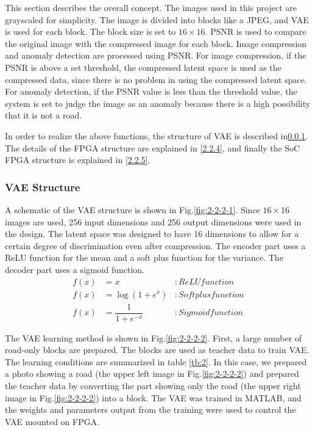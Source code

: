 \documentclass[conference]{IEEEtran}
\begin{document}
This section describes the overall concept.
The images used in this project are grayscaled for simplicity.
The image is divided into blocks like a JPEG, and VAE is used for each block.
The block size is set to $16\times16$.
PSNR is used to compare the original image with the compressed image for each block.
Image compression and anomaly detection are processed using PSNR.
For image compression, if the PSNR is above a set threshold, the compressed latent space is used as the compressed data, since there is no problem in using the compressed latent space.
For anomaly detection, if the PSNR value is less than the threshold value, the system is set to judge the image as an anomaly because there is a high possibility that it is not a road.

In order to realize the above functions, the structure of VAE is described in\ref{2.2.3}.
The details of the FPGA structure are explained in \ref{2.2.4}, and finally the SoC FPGA structure is explained in \ref{2.2.5}.

\subsubsection{VAE Structure}\label{2.2.3}
A schematic of the VAE structure is shown in Fig.\ref{fig:2-2-2-1}.
Since $16 \times 16$ images are used, 256 input dimensions and 256 output dimensions were used in the design.
The latent space was designed to have 16 dimensions to allow for a certain degree of discrimination even after compression.
The encoder part uses a ReLU function for the mean and a soft plus function for the variance.
The decoder part uses a sigmoid function.
\begin{align}
  f(x) &= x &: ReLU function \label{sq:1} \\
  f(x) &= \log(1+e^x) &: Softplus function \label{sq:2}\\
  f(x) &= \dfrac{1}{1+e^{-x}} &: Sigmoid function \label{sq:3}
\end{align}

The VAE learning method is shown in Fig.\ref{fig:2-2-2-2}.
First, a large number of road-only blocks are prepared.
The blocks are used as teacher data to train VAE.
The learning conditions are summarized in table \ref{tb:2}.
In this case, we prepared a photo showing a road (the upper left image in Fig.\ref{fig:2-2-2-2}) and prepared the teacher data by converting the part showing only the road (the upper right image in Fig.\ref{fig:2-2-2-2}) into a block.
The VAE was trained in MATLAB, and the weights and parameters output from the training were used to control the VAE mounted on FPGA.
\end{document}
